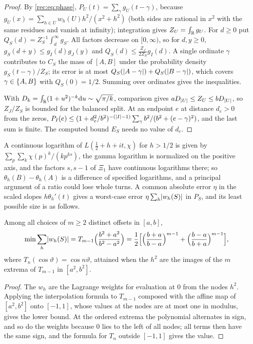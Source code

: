 \begin{proof}
By \eqref{rec:eq:phase}, $P_U(t)=\sum_\gamma g_U(t-\gamma)$, because
$g_U(x)=\sum_{h\in U}w_h(U)h^2/(x^2+h^2)$ (both sides are rational in $x^2$ with the same
residues and vanish at infinity); integration gives $Z_U=\int_{\mathbb{R}} g_U$. For $d\ge0$ put
$Q_S(d)=Z_S^{-1}\int_d^\infty g_S$. All factors decrease on $[0,\infty)$, so for $d,y\ge0$,
$g_S(d+y)\le g_I(d)g_J(y)$ and $Q_S(d)\le\frac{Z_J}{2Z_S}g_I(d)$. A single ordinate $\gamma$
contributes to $C_S$ the mass of $[A,B]$ under the probability density $g_S(t-\gamma)/Z_S$; its
error is at most $Q_S(\lvert A-\gamma\rvert)+Q_S(\lvert B-\gamma\rvert)$, which covers $\gamma\in\{A,B\}$ with
$Q_S(0)=1/2$. Summing over ordinates gives the inequalities.

With $D_k=\int_{\mathbb{R}}(1+u^2)^{-k}\mathrm{d} u\sim\sqrt{\pi/k}$, comparison gives
$aD_{\lvert U\rvert}\le Z_U\le bD_{\lvert U\rvert}$, so $Z_J/Z_S$ is bounded for the balanced split. At an
endpoint $e$ at distance $d_e>0$ from the zeros,
$P_I(e)\le(1+d_e^2/b^2)^{-(\lvert I\rvert-1)}\sum_\gamma b^2/(b^2+(e-\gamma)^2)$, and the last sum is finite.
The computed bound $E_S$ needs no value of $d_e$.
\end{proof}

A continuous logarithm of $L(\tfrac12+h+it,\chi)$ for $h>1/2$ is given by
$\sum_p\sum_k\chi(p)^k/(kp^{ks})$, the gamma logarithm is normalized on the positive axis, and the
factors $s,s-1$ of $\Xi_1$ have continuous logarithms there; so $\theta_h(B)-\theta_h(A)$ is a
difference of specified logarithms, and a principal argument of a ratio could lose whole turns.
A common absolute error $\eta$ in the scaled slopes $h\theta_h'(t)$ gives a worst-case error
$\eta\sum_h\lvert w_h(S)\rvert$ in $P_S$, and its least possible size is as follows.

\begin{theorem}\label{rec:thm:minimax}
Among all choices of $m\ge2$ distinct offsets in $[a,b]$,
\[
 \min\sum_{h}\lvert w_h(S)\rvert=T_{m-1}\Bigl(\frac{b^2+a^2}{b^2-a^2}\Bigr)
 =\frac12\Bigl[\Bigl(\frac{b+a}{b-a}\Bigr)^{m-1}+\Bigl(\frac{b-a}{b+a}\Bigr)^{m-1}\Bigr],
\]
where $T_n(\cos\vartheta)=\cos n\vartheta$, attained when the $h^2$ are the images of the $m$
extrema of $T_{m-1}$ in $[a^2,b^2]$.
\end{theorem}

\begin{proof}
The $w_h$ are the Lagrange weights for evaluation at $0$ from the nodes $h^2$. Applying the
interpolation formula to $T_{m-1}$ composed with the affine map of $[a^2,b^2]$ onto $[-1,1]$,
whose values at the nodes are at most one in modulus, gives the lower bound. At the ordered
extrema the polynomial alternates in sign, and so do the weights because $0$ lies to the left
of all nodes; all terms then have the same sign, and the formula for $T_n$ outside $[-1,1]$
gives the value.
\end{proof}

